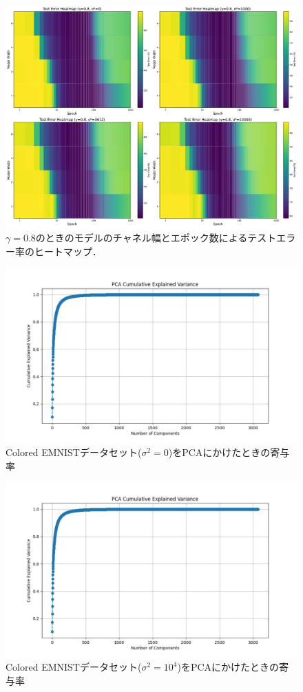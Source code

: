\begin{figure}[H]
    \centering
    \includegraphics[width=\linewidth]{fig/heatmap_ln/ln0.8.pdf}
    \caption{$\gamma=0.8$のときのモデルのチャネル幅とエポック数によるテストエラー率のヒートマップ．}
    \label{fig:modelwidth_heatmap_0.8}
\end{figure}

\newpage

\begin{figure}[H]
    \centering
    \includegraphics[width=\linewidth]{fig/kiyoritu_distribution_colored_EMNIST_Seed42_Var0_Corr0.5.pdf}
    \caption{Colored EMNISTデータセット($\sigma^2 = 0$)をPCAにかけたときの寄与率}
    \label{fig:modelwidth_heatmap_1}
\end{figure}

\begin{figure}[H]
    \centering
    \includegraphics[width=\linewidth]{fig/kiyoritu_distribution_colored_EMNIST_Seed42_Var10000_Corr0.5.pdf}
    \caption{Colored EMNISTデータセット($\sigma^2 = 10^4$)をPCAにかけたときの寄与率}
    \label{fig:modelwidth_heatmap_1}
\end{figure}
